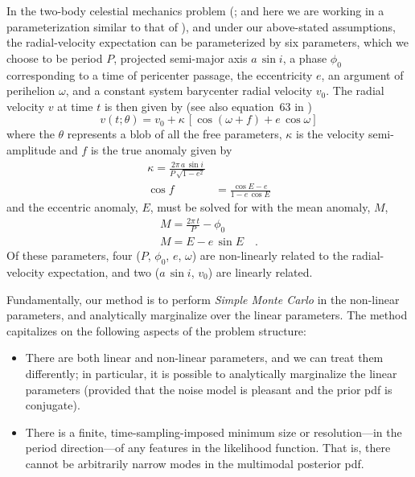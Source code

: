 \documentclass[12pt, preprint]{aastex}
\newcommand{\asini}{\ensuremath{a\,\sin i}}
\begin{document}
In the two-body celestial mechanics problem (\citealt{Kepler:1609};
and here we are working in a parameterization similar to that of
\citealt{Murray:2010}), and under our above-stated assumptions, the
radial-velocity expectation can be parameterized by six parameters,
which we choose to be period $P$, projected semi-major axis $\asini$,
a phase $\phi_0$ corresponding to a time of pericenter passage, the
eccentricity $e$, an argument of perihelion $\omega$, and a constant
system barycenter radial velocity $v_0$.
The radial velocity $v$ at time $t$ is then given by (see also
equation~63 in \citealt{Murray:2010})
\begin{equation}
  v(t;\theta) = v_0 + \kappa\,[\cos(\omega + f) + e\,\cos\omega]
\end{equation}
where the $\theta$ represents a blob of all the free parameters,
$\kappa$ is the velocity semi-amplitude and $f$ is the true anomaly
given by
\begin{align}
  \kappa = \frac{2\pi\,\asini}{P\,\sqrt{1-e^2}}\\
  \cos f &= \frac{\cos E - e}{1 - e\, \cos E}
\end{align}
and the eccentric anomaly, $E$, must be solved for with the mean
anomaly, $M$,
\begin{align}
  M = \frac{2\pi\, t}{P} - \phi_0\\
  M = E - e\,\sin E \quad .
\end{align}
Of these parameters, four ($P$, $\phi_0$, $e$, $\omega$) are
non-linearly related to the radial-velocity expectation, and two
($\asini$, $v_0$) are linearly related.

Fundamentally, our method is to perform \emph{Simple Monte Carlo} in
the non-linear parameters, and analytically marginalize over the linear
parameters.
The method capitalizes on the following aspects of the problem
structure:
\begin{itemize}
\item There are both linear and non-linear parameters, and we can
  treat them differently; in particular, it is possible to
  analytically marginalize the linear parameters (provided that the
  noise model is pleasant and the prior pdf is conjugate).
\item There is a finite, time-sampling-imposed minimum size or
  resolution---in the period direction---of any features in the
  likelihood function. That is, there cannot be arbitrarily narrow
  modes in the multimodal posterior pdf.
\end{itemize}
\end{document}
